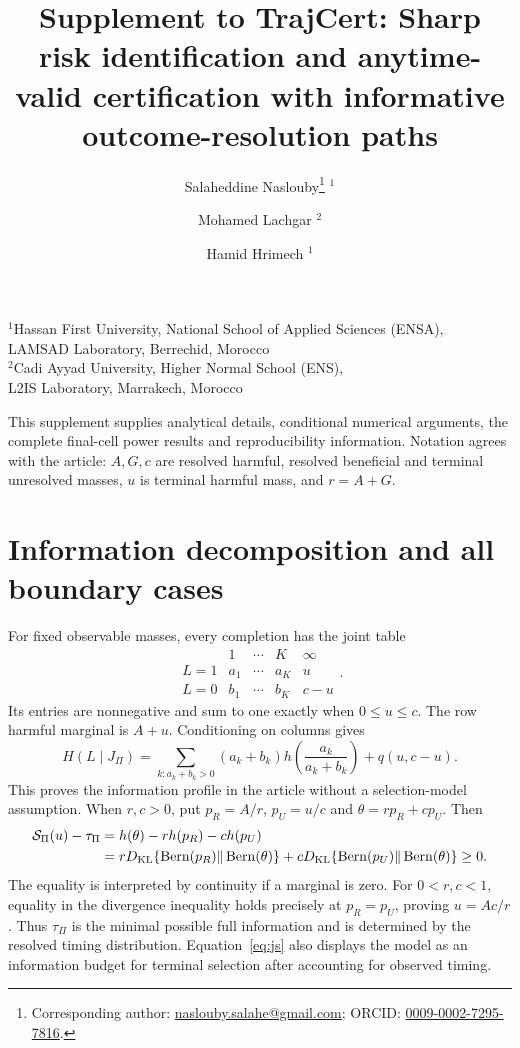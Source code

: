 \documentclass[10pt]{article}
\title{Supplement to TrajCert: Sharp risk identification and anytime-valid certification with informative outcome-resolution paths}
\author{Salaheddine Naslouby\thanks{Corresponding author: \href{mailto:naslouby.salahe@gmail.com}{naslouby.salahe@gmail.com}; ORCID: \href{https://orcid.org/0009-0002-7295-7816}{0009-0002-7295-7816}.} $^{1}$ \and Mohamed Lachgar $^{2}$ \and Hamid Hrimech $^{1}$}
\date{}
\begin{document}
\maketitle
\begin{center}\small
$^{1}$Hassan First University, National School of Applied Sciences (ENSA),\\
LAMSAD Laboratory, Berrechid, Morocco\\
$^{2}$Cadi Ayyad University, Higher Normal School (ENS),\\
L2IS Laboratory, Marrakech, Morocco
\end{center}
This supplement supplies analytical details, conditional numerical arguments, the complete final-cell power results and reproducibility information. Notation agrees with the article: $A,G,c$ are resolved harmful, resolved beneficial and terminal unresolved masses, $u$ is terminal harmful mass, and $r=A+G$.

\section{Information decomposition and all boundary cases}
For fixed observable masses, every completion has the joint table
\begin{equation}
 \begin{array}{c|cccc} &1&\cdots&K&\infty\\\hline
 L=1&a_1&\cdots&a_K&u\\
 L=0&b_1&\cdots&b_K&c-u
 \end{array}.
\end{equation}
Its entries are nonnegative and sum to one exactly when $0\le u\le c$. The row harmful marginal is $A+u$. Conditioning on columns gives
\begin{equation}
 H(L\mid J_\Pi)=\sum_{k:a_k+b_k>0}(a_k+b_k)h\left(\frac{a_k}{a_k+b_k}\right)+q(u,c-u).
\end{equation}
This proves the information profile in the article without a selection-model assumption. When $r,c>0$, put $p_R=A/r$, $p_U=u/c$ and $\theta=rp_R+cp_U$. Then
\begin{align}
 \mathcal S_\Pi(u)-\tau_\Pi
 &=h(\theta)-r h(p_R)-c h(p_U)\\
 &=rD_{\mathrm{KL}}\{\operatorname{Bern}(p_R)\Vert\operatorname{Bern}(\theta)\}
 +cD_{\mathrm{KL}}\{\operatorname{Bern}(p_U)\Vert\operatorname{Bern}(\theta)\}\ge0.\label{eq:js}
\end{align}
The equality is interpreted by continuity if a marginal is zero. For $0<r,c<1$, equality in the divergence inequality holds precisely at $p_R=p_U$, proving $u=Ac/r$. Thus $\tau_\Pi$ is the minimal possible full information and is determined by the resolved timing distribution. Equation~\eqref{eq:js} also displays the model as an information budget for terminal selection after accounting for observed timing.
\end{document}
